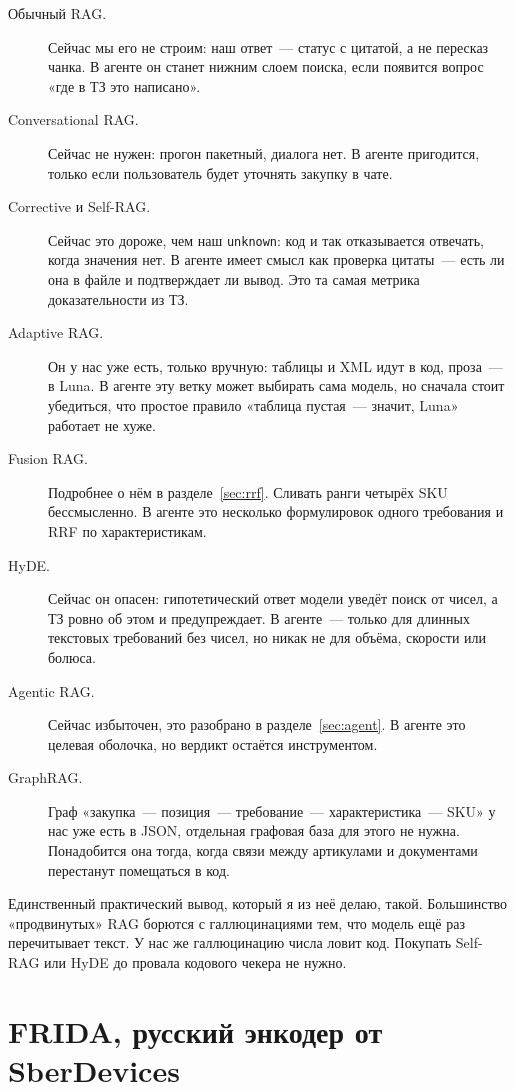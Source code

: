 \documentclass[11pt,a4paper]{article}
\begin{document}
\begin{description}
  \item[Обычный RAG.] Сейчас мы его не строим: наш ответ~--- статус с цитатой, а не пересказ чанка. В агенте он станет нижним слоем поиска, если появится вопрос «где в ТЗ это написано».
  \item[Conversational RAG.] Сейчас не нужен: прогон пакетный, диалога нет. В агенте пригодится, только если пользователь будет уточнять закупку в чате.
  \item[Corrective и Self-RAG.] Сейчас это дороже, чем наш \texttt{unknown}: код и так отказывается отвечать, когда значения нет. В агенте имеет смысл как проверка цитаты~--- есть ли она в файле и подтверждает ли вывод. Это та самая метрика доказательности из ТЗ.
  \item[Adaptive RAG.] Он у нас уже есть, только вручную: таблицы и XML идут в код, проза~--- в Luna. В агенте эту ветку может выбирать сама модель, но сначала стоит убедиться, что простое правило «таблица пустая~--- значит, Luna» работает не хуже.
  \item[Fusion RAG.] Подробнее о нём в разделе~\ref{sec:rrf}. Сливать ранги четырёх SKU бессмысленно. В агенте это несколько формулировок одного требования и RRF по характеристикам.
  \item[HyDE.] Сейчас он опасен: гипотетический ответ модели уведёт поиск от чисел, а ТЗ ровно об этом и предупреждает. В агенте~--- только для длинных текстовых требований без чисел, но никак не для объёма, скорости или болюса.
  \item[Agentic RAG.] Сейчас избыточен, это разобрано в разделе~\ref{sec:agent}. В агенте это целевая оболочка, но вердикт остаётся инструментом.
  \item[GraphRAG.] Граф «закупка~--- позиция~--- требование~--- характеристика~--- SKU» у нас уже есть в JSON, отдельная графовая база для этого не нужна. Понадобится она тогда, когда связи между артикулами и документами перестанут помещаться в код.
\end{description}

Единственный практический вывод, который я из неё делаю, такой. Большинство «продвинутых» RAG борются с галлюцинациями тем, что модель ещё раз перечитывает текст. У нас же галлюцинацию числа ловит код. Покупать Self-RAG или HyDE до провала кодового чекера не нужно.

\section{FRIDA, русский энкодер от SberDevices}
\end{document}
